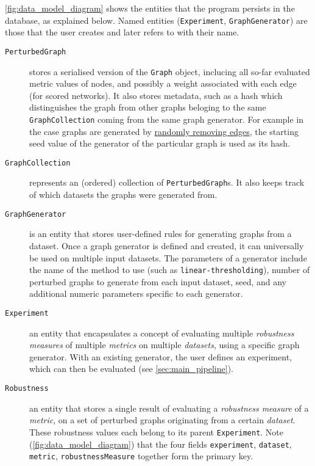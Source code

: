 

\autoref{fig:data_model_diagram} shows the entities that the program persists in the database, as explained below.
Named entities (\texttt{Experiment}, \texttt{GraphGenerator}) are those that the user creates and later refers to with their name.
\begin{description}
    \item[\texttt{PerturbedGraph}]
    stores a serialised version of the \texttt{Graph} object, inclucing all so-far evaluated metric values of nodes, and possibly a weight associated with each edge (for scored networks).
    It also stores metadata, such as a hash which distinguishes the graph from other graphs beloging to the same \texttt{GraphCollection} coming from the same graph generator.
    For example in the case graphs are generated by \hyperref[sec:randomly_removing_edges]{randomly removing edges}, the starting seed value of the generator of the particular graph is used as its hash.

    \item[\texttt{GraphCollection}]
    represents an (ordered) collection of \texttt{PerturbedGraph}s.
    It also keeps track of which datasets the graphs were generated from.

    \item[\texttt{GraphGenerator}]
    is an entity that stores user-defined rules for generating graphs from a dataset.
    Once a graph generator is defined and created, it can universally be used on multiple input datasets.
    The parameters of a generator include the name of the method to use (such as \texttt{linear-thresholding}), number of perturbed graphs to generate from each input dataset, seed, and any additional numeric parameters specific to each generator.

    \item[\texttt{Experiment}]
    an entity that encapsulates a concept of evaluating multiple \textsl{robustness measures} of multiple \textsl{metrics} on multiple \textsl{datasets}, using a specific graph generator.
    With an existing generator, the user defines an experiment, which can then be evaluated (see \autoref{sec:main_pipeline}).

    \item[\texttt{Robustness}]
    an entity that stores a single result of evaluating a \textsl{robustness measure} of a \textsl{metric}, on a set of perturbed graphs originating from a certain \textsl{dataset}.
    These robustness values each belong to its parent \texttt{Experiment}.
    Note (\autoref{fig:data_model_diagram}) that the four fields \texttt{experiment}, \texttt{dataset}, \texttt{metric}, \texttt{robustnessMeasure} together form the primary key.
\end{description}


